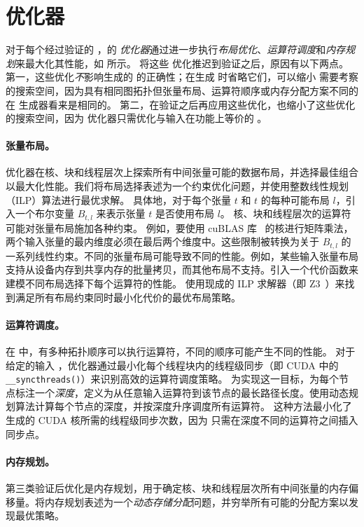\section{\graph 优化器}
\label{sec:optimizer}

对于每个经过验证的 \graph，\sys 的 {\em \graph 优化器}通过进一步执行{\em 布局优化}、{\em 运算符调度}和{\em 内存规划}来最大化其性能，如  所示。
\sys 将这些 \graph 优化推迟到验证之后，原因有以下两点。
第一，这些优化{\em 不}影响生成的 \graphs 的正确性；在生成 \graphs 时省略它们，可以缩小 \sys 需要考察的搜索空间，因为具有相同图拓扑但张量布局、运算符顺序或内存分配方案不同的 \graphs 在 \graph 生成器看来是相同的。
第二，在验证之后再应用这些优化，也缩小了这些优化的搜索空间，因为 \graph 优化器只需优化与输入在功能上等价的 \graphs。

\paragraph{张量布局。}\graph 优化器在核、块和线程层次上探索所有中间张量可能的数据布局，并选择最佳组合以最大化性能。我们将布局选择表述为一个约束优化问题，并使用整数线性规划（ILP）算法进行最优求解。
具体地，对于每个张量 $t$ 和 $t$ 的每种可能布局 $l$，引入一个布尔变量 $B_{t,l}$ 来表示张量 $t$ 是否使用布局 $l$。
核、块和线程层次的运算符可能对张量布局施加各种约束。
例如，要使用 cuBLAS 库~\cite{cublas} 的核进行矩阵乘法，两个输入张量的最内维度必须在最后两个维度中。这些限制被转换为关于 $B_{t, l}$ 的一系列线性约束。不同的张量布局可能导致不同的性能。例如，某些输入张量布局支持从设备内存到共享内存的批量拷贝，而其他布局不支持。\sys 引入一个代价函数来建模不同布局选择下每个运算符的性能。
\sys 使用现成的 ILP 求解器（即 Z3~\cite{z3}）来找到满足所有布局约束同时最小化代价的最优布局策略。

\paragraph{运算符调度。}在 \graph 中，有多种拓扑顺序可以执行运算符，不同的顺序可能产生不同的性能。
对于给定的输入 \graph，\graph 优化器通过最小化每个线程块内的线程级同步（即 CUDA 中的 {\tt \_\_syncthreads()}）来识别高效的运算符调度策略。
为实现这一目标，\sys 为每个节点标注一个{\em 深度}，定义为从任意输入运算符到该节点的最长路径长度。\sys 使用动态规划算法计算每个节点的深度，并按深度升序调度所有运算符。
这种方法最小化了生成的 CUDA 核所需的线程级同步次数，因为 \sys 只需在深度不同的运算符之间插入同步点。

\paragraph{内存规划。}第三类验证后优化是内存规划，用于确定核、块和线程层次所有中间张量的内存偏移量。\sys 将内存规划表述为一个{\em 动态存储分配}问题，并穷举所有可能的分配方案以发现最优策略。
